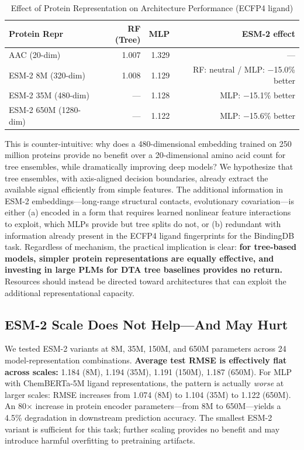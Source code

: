 \documentclass[11pt,twocolumn,a4paper]{article}
\begin{document}
\begin{table}[t]
\centering
\caption{Effect of Protein Representation on Architecture Performance (ECFP4 ligand)}
\label{tab:repr_effect}
\begin{tabular}{lrrr}
\toprule
\textbf{Protein Repr} & \textbf{RF (Tree)} & \textbf{MLP} & \textbf{ESM-2 effect} \\
\midrule
AAC (20-dim)          & 1.007 & 1.329 & --- \\
ESM-2 8M (320-dim)    & 1.008 & 1.129 & RF: neutral / MLP: $-$15.0\% better \\
ESM-2 35M (480-dim)   & ---   & 1.128 & MLP: $-$15.1\% better \\
ESM-2 650M (1280-dim) & ---   & 1.122 & MLP: $-$15.6\% better \\
\bottomrule
\end{tabular}
\end{table}

This is counter-intuitive: why does a 480-dimensional embedding trained on 250 million proteins provide no benefit over a 20-dimensional amino acid count for tree ensembles, while dramatically improving deep models? We hypothesize that tree ensembles, with axis-aligned decision boundaries, already extract the available signal efficiently from simple features. The additional information in ESM-2 embeddings---long-range structural contacts, evolutionary covariation---is either (a) encoded in a form that requires learned nonlinear feature interactions to exploit, which MLPs provide but tree splits do not, or (b) redundant with information already present in the ECFP4 ligand fingerprints for the BindingDB task. Regardless of mechanism, the practical implication is clear: \textbf{for tree-based models, simpler protein representations are equally effective, and investing in large PLMs for DTA tree baselines provides no return.} Resources should instead be directed toward architectures that can exploit the additional representational capacity.

\subsection{ESM-2 Scale Does Not Help---And May Hurt}

We tested ESM-2 variants at 8M, 35M, 150M, and 650M parameters across 24 model-representation combinations. \textbf{Average test RMSE is effectively flat across scales:} 1.184 (8M), 1.194 (35M), 1.191 (150M), 1.187 (650M). For MLP with ChemBERTa-5M ligand representations, the pattern is actually \textit{worse} at larger scales: RMSE increases from 1.074 (8M) to 1.104 (35M) to 1.122 (650M). An 80$\times$ increase in protein encoder parameters---from 8M to 650M---yields a 4.5\% degradation in downstream prediction accuracy. The smallest ESM-2 variant is sufficient for this task; further scaling provides no benefit and may introduce harmful overfitting to pretraining artifacts.
\end{document}
